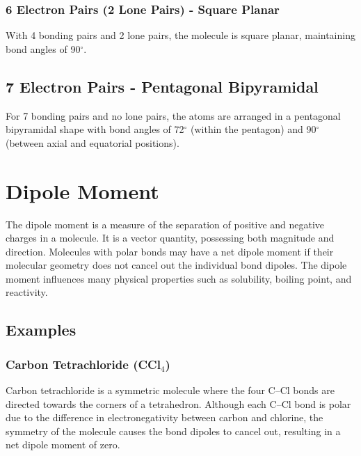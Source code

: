 \documentclass{report}
\begin{document}
\subsubsection{6 Electron Pairs (2 Lone Pairs) - Square Planar}
With 4 bonding pairs and 2 lone pairs, the molecule is square planar, maintaining bond angles of 90$^\circ$.
\begin{center}
\end{center}

\subsection{7 Electron Pairs - Pentagonal Bipyramidal}
For 7 bonding pairs and no lone pairs, the atoms are arranged in a pentagonal bipyramidal shape with bond angles of 72$^\circ$ (within the pentagon) and 90$^\circ$ (between axial and equatorial positions).
\begin{center}
\end{center}

\section{Dipole Moment}

The dipole moment is a measure of the separation of positive and negative charges in a molecule. It is a vector quantity, possessing both magnitude and direction. Molecules with polar bonds may have a net dipole moment if their molecular geometry does not cancel out the individual bond dipoles. The dipole moment influences many physical properties such as solubility, boiling point, and reactivity.

\subsection{Examples}

\subsubsection{Carbon Tetrachloride (CCl$_4$)}

Carbon tetrachloride is a symmetric molecule where the four C--Cl bonds are directed towards the corners of a tetrahedron. Although each C--Cl bond is polar due to the difference in electronegativity between carbon and chlorine, the symmetry of the molecule causes the bond dipoles to cancel out, resulting in a net dipole moment of zero.
\end{document}
